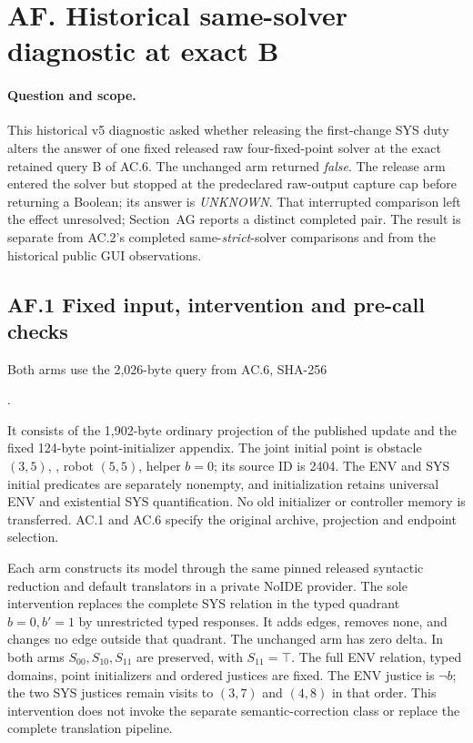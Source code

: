\clearpage
\section*{AF. Historical same-solver diagnostic at exact B}
\label{supp:r8-same-solver-diagnostic}

\paragraph{Question and scope.}
This historical v5 diagnostic asked whether releasing the first-change SYS duty
alters the answer of one fixed released raw four-fixed-point solver at
the exact retained query B of AC.6. The unchanged arm returned
\emph{false}. The release arm entered the solver but stopped at the
predeclared raw-output capture cap before returning a Boolean; its answer
is \emph{UNKNOWN}. That interrupted comparison left the effect unresolved;
Section~AG reports a distinct completed pair.
The result is separate from AC.2's completed same-\emph{strict}-solver
comparisons and from the historical public GUI observations.

\subsection*{AF.1 Fixed input, intervention and pre-call checks}
Both arms use the 2,026-byte query from AC.6, SHA-256
\begin{center}\small
{}.
\end{center}
It consists of the 1,902-byte ordinary projection of the published update
and the fixed 124-byte point-initializer appendix. The joint initial point
is obstacle $(3,5)$, , robot $(5,5)$, helper $b=0$;
its source ID is 2404. The ENV and SYS initial predicates are separately
nonempty, and initialization retains universal ENV and existential SYS
quantification. No old initializer or controller memory is transferred.
AC.1 and AC.6 specify the original archive, projection and endpoint selection.

Each arm constructs its model through the same pinned released syntactic
reduction and default translators in a private NoIDE provider. The sole
intervention replaces the complete SYS relation in the typed quadrant
$b=0,b'=1$ by unrestricted typed responses. It adds edges, removes none,
and changes no edge outside that quadrant. The unchanged arm has zero
delta. In both arms $S_{00},S_{10},S_{11}$ are preserved, with
$S_{11}=\top$. The full ENV relation, typed domains, point initializers
and ordered justices are fixed. The ENV justice is $\neg b$; the two SYS
justices remain visits to $(3,7)$ and $(4,8)$ in that order.
This intervention does not invoke the separate semantic-correction class
or replace the complete translation pipeline.

